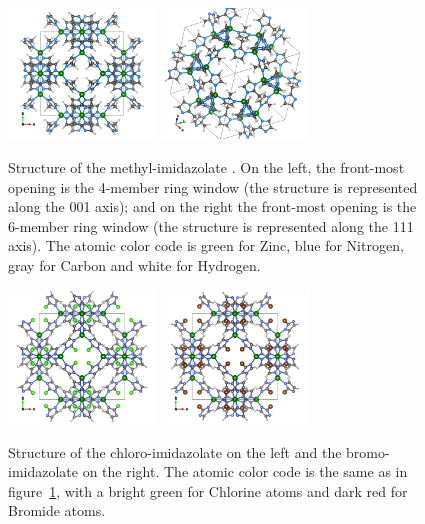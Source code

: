 \documentclass[thesis]{subfiles}
\begin{document}
\begin{figure}[ht]
    \centering
    \includegraphics[width=0.35\textwidth]{figures/images/ZIF8-100}
    \hspace{2em}
    \includegraphics[width=0.35\textwidth]{figures/images/ZIF8-111}
    \caption{Structure of the methyl-imidazolate . On the left, the
    front-most opening is the 4-member ring window (the structure is represented
    along the 001 axis); and on the right the front-most opening is the 6-member
    ring window (the structure is represented along the 111 axis). The atomic
    color code is green for Zinc, blue for Nitrogen, gray for Carbon and white
    for Hydrogen.}
    \label{fig:zif8-ch3:structure}
\end{figure}

\begin{figure}[ht]
    \centering
    \includegraphics[width=0.35\textwidth]{figures/images/ZIF8-Cl}
    \hspace{2em}
    \includegraphics[width=0.35\textwidth]{figures/images/ZIF8-Br}
    \caption{Structure of the chloro-imidazolate \ZIFCl on the left and the
    bromo-imidazolate \ZIFBr on the right. The atomic color code is the same
    as in figure~\ref{fig:zif8-ch3:structure}, with a bright green for Chlorine
    atoms and dark red for Bromide atoms.}
    \label{fig:zif8-x:structures}
\end{figure}
\end{document}
